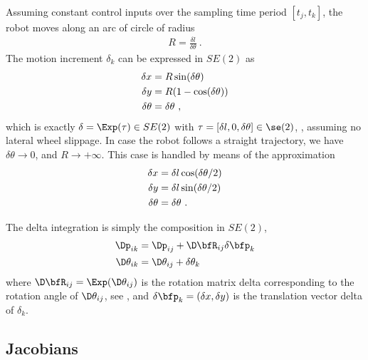 Assuming constant control inputs over the sampling time period $[t_j,t_k]$, the robot
moves along an arc of circle of radius
%
\begin{align}
R = \frac{\delta l}{\delta \theta} 
~.
\end{align}
%
The motion increment $\delta_k$ can be expressed in $SE(2)$ as
%
\begin{align}
\label{equ:diff_drive_exact_inte}
\delta x &= R\sin(\delta\theta) \notag\\
\delta y &= R(1-\cos(\delta\theta)) \\
\delta\theta &= \delta \theta \notag 
~,
\end{align}
%
which is exactly $\delta=\Exp(\tau)\in SE(2)$ with $\tau=[\delta l,0,\delta \theta]\in\se(2)$, \ie, assuming no lateral wheel slippage.
%
In case the robot follows a straight trajectory, we have $\delta \theta\to0$,
and $R\to+\infty$.
This case is handled by means of the approximation %
%
\begin{align}
\label{equ:diff_drive_runge_kutta_inte}
%
%
\delta x &= \delta l \cos(\delta\theta/2) \notag \\
%
\delta y &= \delta l \sin(\delta\theta/2) \\
%
\delta\theta &= \delta \theta \notag 
~.
\end{align}



The delta integration is simply the composition in $SE(2)$,
%
\begin{align}\label{equ:diff_drive_composition}
\begin{split}
\Dp_{ik} &= \Dp_{ij} + \D\bfR_{ij}\delta \bfp_k \\
\D\theta_{ik} &= \D\theta_{ij} + \delta\theta_k
\end{split}
\end{align}
%
where $\D\bfR_{ij}=\Exp(\D\theta_{ij})$ is the rotation matrix delta corresponding to the
rotation angle of $\D\theta_{ij}$, see , and $\delta \bfp_k=(\delta x,\delta y)$ is the translation vector delta of $\delta_k$.


\subsection{Jacobians}
\label{sec:diff_drive_jacs}
%
